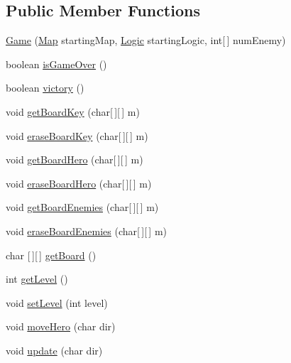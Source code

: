\subsection*{Public Member Functions}
\begin{DoxyCompactItemize}
\item 
\hyperlink{classdkeep_1_1logic_1_1_game_ad630e9f66ca2e6fc818411499b9a7d7a}{Game} (\hyperlink{classdkeep_1_1logic_1_1_map}{Map} starting\+Map, \hyperlink{classdkeep_1_1logic_1_1_logic}{Logic} starting\+Logic, int\mbox{[}$\,$\mbox{]} num\+Enemy)
\item 
boolean \hyperlink{classdkeep_1_1logic_1_1_game_a6f548ad7f01432adb418f5891f130ec4}{is\+Game\+Over} ()
\item 
boolean \hyperlink{classdkeep_1_1logic_1_1_game_af2953cb36d8db8ff068d0291f6c6dbba}{victory} ()
\item 
void \hyperlink{classdkeep_1_1logic_1_1_game_a45d8230123f2046b5d5a82ba7e6b2147}{get\+Board\+Key} (char\mbox{[}$\,$\mbox{]}\mbox{[}$\,$\mbox{]} m)
\item 
void \hyperlink{classdkeep_1_1logic_1_1_game_a5a87ac790c4389d6e6066e19e4be4983}{erase\+Board\+Key} (char\mbox{[}$\,$\mbox{]}\mbox{[}$\,$\mbox{]} m)
\item 
void \hyperlink{classdkeep_1_1logic_1_1_game_a4d9a18b2ade5e68657a41d2f2516f696}{get\+Board\+Hero} (char\mbox{[}$\,$\mbox{]}\mbox{[}$\,$\mbox{]} m)
\item 
void \hyperlink{classdkeep_1_1logic_1_1_game_afe09f2713bb62e5ace6943edb3306043}{erase\+Board\+Hero} (char\mbox{[}$\,$\mbox{]}\mbox{[}$\,$\mbox{]} m)
\item 
void \hyperlink{classdkeep_1_1logic_1_1_game_a891c0dd84b0a828714135cf2e56258e8}{get\+Board\+Enemies} (char\mbox{[}$\,$\mbox{]}\mbox{[}$\,$\mbox{]} m)
\item 
void \hyperlink{classdkeep_1_1logic_1_1_game_acb0bd46f08b7987f30692afcc49525cf}{erase\+Board\+Enemies} (char\mbox{[}$\,$\mbox{]}\mbox{[}$\,$\mbox{]} m)
\item 
char \mbox{[}$\,$\mbox{]}\mbox{[}$\,$\mbox{]} \hyperlink{classdkeep_1_1logic_1_1_game_a00104638b06a79e0b90768a1df2628c2}{get\+Board} ()
\item 
int \hyperlink{classdkeep_1_1logic_1_1_game_ada3e80740d47374027077803c6442ca4}{get\+Level} ()
\item 
void \hyperlink{classdkeep_1_1logic_1_1_game_af80ce295e13bccbe8fe6f48399d4d808}{set\+Level} (int level)
\item 
void \hyperlink{classdkeep_1_1logic_1_1_game_a10736bc5627d884177a850b7b3182fb4}{move\+Hero} (char dir)
\item 
void \hyperlink{classdkeep_1_1logic_1_1_game_add0b32fc7d2370e0071ccdf85ee341e1}{update} (char dir)
\end{DoxyCompactItemize}


